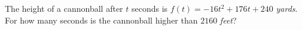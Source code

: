 The height of a cannonball after $t$ seconds is $f(t)=-16t^2+176t+240$ \emph{yards}. For how many seconds is the cannonball higher than $2160$ \emph{feet}?
